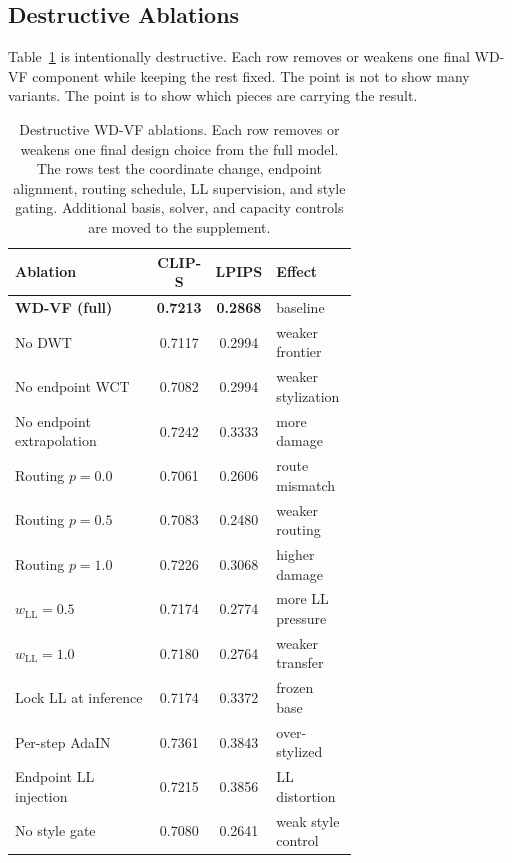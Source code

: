 \documentclass[letterpaper]{article}
\begin{document}
\subsection{Destructive Ablations}
\label{sec:ablation}

Table~\ref{tab:ablation} is intentionally destructive.
Each row removes or weakens one final WD-VF component while keeping the rest fixed.
The point is not to show many variants.
The point is to show which pieces are carrying the result.

\begin{table}[t]
\centering
\caption{Destructive WD-VF ablations.
Each row removes or weakens one final design choice from the full model.
The rows test the coordinate change, endpoint alignment, routing schedule, LL supervision, and style gating.
Additional basis, solver, and capacity controls are moved to the supplement.}
\label{tab:ablation}
\scriptsize
\renewcommand{\arraystretch}{0.80}
\setlength{\tabcolsep}{3pt}
\begin{tabular}{@{}p{0.44\linewidth}ccp{0.24\linewidth}@{}}
\toprule
Ablation & CLIP-S & LPIPS & Effect \\
\midrule
\textbf{WD-VF (full)} & \textbf{0.7213} & \textbf{0.2868} & baseline \\
\midrule
\quad No DWT & 0.7117 & 0.2994 & weaker frontier \\
\quad No endpoint WCT & 0.7082 & 0.2994 & weaker stylization \\
\quad No endpoint extrapolation & 0.7242 & 0.3333 & more damage \\
\quad Routing $p=0.0$ & 0.7061 & 0.2606 & route mismatch \\
\quad Routing $p=0.5$ & 0.7083 & 0.2480 & weaker routing \\
\quad Routing $p=1.0$ & 0.7226 & 0.3068 & higher damage \\
\quad $w_{\mathrm{LL}}=0.5$ & 0.7174 & 0.2774 & more LL pressure \\
\quad $w_{\mathrm{LL}}=1.0$ & 0.7180 & 0.2764 & weaker transfer \\
\quad Lock LL at inference & 0.7174 & 0.3372 & frozen base \\
\quad Per-step AdaIN & 0.7361 & 0.3843 & over-stylized \\
\quad Endpoint LL injection & 0.7215 & 0.3856 & LL distortion \\
\quad No style gate & 0.7080 & 0.2641 & weak style control \\
\bottomrule
\end{tabular}
\end{table}
\end{document}
